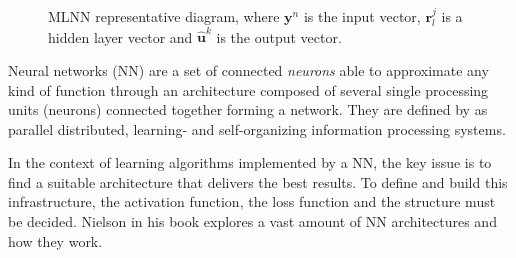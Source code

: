 \documentclass[conference]{IEEEtran}
\begin{document}
\begin{figure}[!hbp]
\centering


\caption{MLNN representative diagram, where $\textbf{y}^n$ is the input vector, $\textbf{r}_{l}^{j}$ is a hidden layer vector
and $\hat{\textbf{u}}^{k}$ is the output vector.} \label{fig:NN}
\end{figure}

Neural networks (NN) are a set of connected \textit{neurons} able to approximate any kind of function through an architecture composed of several single processing units (neurons) connected together forming a network. They are defined by \cite{b9} as parallel distributed, learning- and self-organizing information processing systems. 

In the context of learning algorithms implemented by a NN, the key issue is to find a suitable architecture that delivers the best results. To define and build this infrastructure, the activation function, the loss function and the structure must be decided. Nielson \cite{b8} in his book explores a vast amount of NN architectures and how they work. 
\end{document}
